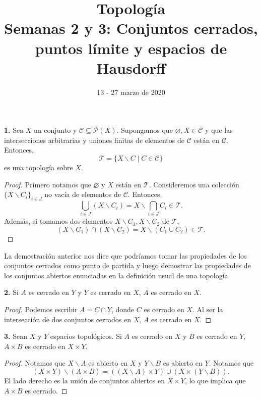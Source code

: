 \documentclass{article}
\begin{document}
\date{13 - 27 marzo de 2020}
\title{ \textbf{Topología} \\
Semanas 2 y 3: Conjuntos cerrados, puntos límite y espacios de Hausdorff}
\maketitle	
\begin{mybox}
	\textbf{1.} Sea $X$ un conjunto y $\mathcal{C} \subseteq \mathcal{P}(X)$. Supongamos que $\varnothing, X \in \mathcal{C}$ y que las intersecciones arbitrarias y uniones finitas de elementos de $\mathcal{C}$ están en $\mathcal{C}$. Entonces, 
	$$ \mathcal{T} = \{ X \backslash C \mid C \in \mathcal{C} \} $$ 
	es una topología sobre $X$.
\end{mybox}	 
\begin{proof}
Primero notamos que $\varnothing$ y $X$ están en $\mathcal{T}$. Consideremos una colección $\{ X \backslash C_{i} \}_{i \in J}$ no vacía de elementos de $\mathcal{C}$. Entonces, 
$$ \bigcup _{i \in J} \left( X \backslash C_{i} \right)  = X \backslash \bigcap_{i \in J} C_{i} \in \mathcal{T}.$$
Además, si tomamos dos elementos $X\backslash C_{1}, X\backslash C_{2}$ de $\mathcal{T}$,
$$ (X \backslash C_{1}) \cap (X \backslash C_{2}) = X \backslash \left( C_{1} \cup C_{2} \right) \in \mathcal{T}. $$
\end{proof}

La demostración anterior nos dice que podríamos tomar las propiedades de los conjuntos cerrados como punto de partida y luego demostrar las propiedades de los conjuntos abiertos enunciadas en la definición usual de una topología. \\

\begin{mybox}
	\textbf{2. } Si $A$ es cerrado en $Y$ y $Y$ es cerrado en $X$, $A$ es cerrado en $X$.
\end{mybox}	
\begin{proof}
Podemos escribir $A = C \cap Y$, donde $C$ es cerrado en $X$. Al ser la intersección de dos conjuntos cerrados en $X$, $A$ es cerrado en $X$. 
\end{proof}
\begin{mybox}
	\textbf{3. } Sean $X$ y $Y$ espacios topológicos. Si $A$ es cerrado en $X$ y $B$ es cerrado en $Y$, $A \times B$ es cerrado en $X \times Y$. 
\end{mybox}	
\begin{proof}
	Notamos que $X \backslash A$ es abierto en $X$ y $Y \backslash B$ es abierto en $Y$. Notamos que 
	$$ \left( X \times Y \right) \backslash \left( A \times B \right) =   \left( \left( X \backslash A \right) \times Y \right) \cup \left( X \times \left( Y \backslash B \right) \right). $$
	El lado derecho es la unión de conjuntos abiertos en $X \times Y$, lo que implica que $A \times B$ es cerrado.  
\end{proof}
\end{document}
